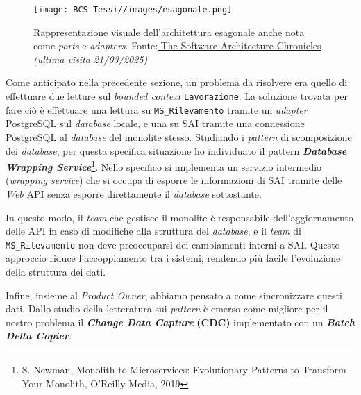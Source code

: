         \begin{figure}[H]
            \centering
            \texttt{[image: BCS-Tessi//images/esagonale.png]}
            \caption[Architettura esagonale]{Rappresentazione visuale dell'architettura esagonale anche nota come \textit{ports} e \textit{adapters}. Fonte:\href{https://herbertograca.com/2017/11/16/explicit-architecture-01-ddd-hexagonal-onion-clean-cqrs-how-i-put-it-all-together/fundamental-blocks-of-the-system}{ The Software Architecture Chronicles} \textit{(ultima visita 21/03/2025)}}
            \label{fig:esagonale}
        \end{figure}

        \vspace{0.2 em}
        \noindent Come anticipato nella precedente sezione, un problema da risolvere era quello di effettuare due letture sul \textit{bounded context} \texttt{Lavorazione}. La soluzione trovata per fare ciò è effettuare una lettura su \texttt{MS\_Rilevamento} tramite un \textit{adapter} PostgreSQL sul \textit{database} locale, e una su SAI tramite una connessione PostgreSQL al \textit{database} del monolite stesso. Studiando i \textit{pattern} di scomposizione dei \textit{database}, per questa specifica situazione ho individuato il pattern \textbf{\textit{Database Wrapping Service}}\footnote{S. Newman, Monolith to Microservices: Evolutionary Patterns to Transform Your Monolith, O'Reilly Media, 2019}. Nello specifico si implementa un servizio intermedio (\textit{wrapping service}) che si occupa di esporre le informazioni di SAI tramite delle \textit{Web} API senza esporre direttamente il \textit{database} sottostante. 

        \vspace{0.2 em}
        \noindent In questo modo, il \textit{team} che gestisce il monolite è responsabile dell’aggiornamento delle API in caso di modifiche alla struttura del \textit{database}, e il \textit{team} di \texttt{MS\_Rilevamento} non deve preoccuparsi dei cambiamenti interni a SAI. Questo approccio riduce l'accoppiamento tra i sistemi, rendendo più facile l'evoluzione della struttura dei dati.

        \vspace{0.2 em}
        \noindent Infine, insieme al \textit{Product Owner}, abbiamo pensato a come sincronizzare questi dati. Dallo studio della letteratura sui \textit{pattern} è emerso come migliore per il nostro problema il \textit{\textbf{Change Data Capture}} \textbf{(CDC)} implementato con un \textbf{\textit{Batch Delta Copier}}. 
        
